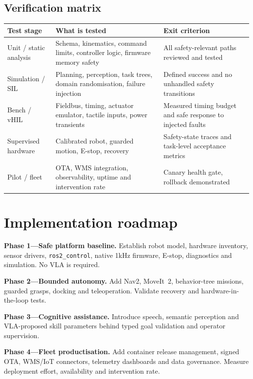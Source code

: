 \documentclass[10pt,a4paper]{article}
\begin{document}
\subsection{Verification matrix}
\begin{table}[ht]
\centering\small
\begin{tabularx}{\textwidth}{@{}lYY@{}}
\toprule
Test stage & What is tested & Exit criterion \\
\midrule
Unit / static analysis & Schema, kinematics, command limits, controller logic, firmware memory safety & All safety-relevant paths reviewed and tested \\
Simulation / SIL & Planning, perception, task trees, domain randomisation, failure injection & Defined success and no unhandled safety transitions \\
Bench / vHIL & Fieldbus, timing, actuator emulator, tactile inputs, power transients & Measured timing budget and safe response to injected faults \\
Supervised hardware & Calibrated robot, guarded motion, E-stop, recovery & Safety-state traces and task-level acceptance metrics \\
Pilot / fleet & OTA, WMS integration, observability, uptime and intervention rate & Canary health gate, rollback demonstrated \\
\bottomrule
\end{tabularx}
\end{table}

\section{Implementation roadmap}
\textbf{Phase 1---Safe platform baseline.} Establish robot model, hardware inventory, sensor drivers, \texttt{ros2\_control}, native 1kHz firmware, E-stop, diagnostics and simulation. No VLA is required.

\textbf{Phase 2---Bounded autonomy.} Add Nav2, MoveIt~2, behavior-tree missions, guarded grasps, docking and teleoperation. Validate recovery and hardware-in-the-loop tests.

\textbf{Phase 3---Cognitive assistance.} Introduce speech, semantic perception and VLA-proposed skill parameters behind typed goal validation and operator supervision.

\textbf{Phase 4---Fleet productisation.} Add container release management, signed OTA, WMS/IoT connectors, telemetry dashboards and data governance. Measure deployment effort, availability and intervention rate.
\end{document}
